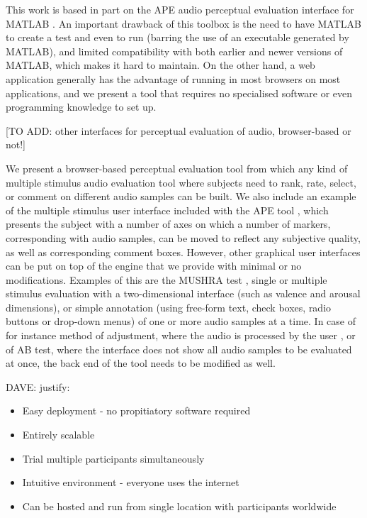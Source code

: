 \documentclass{article}
\begin{document}
This work is based in part on the APE audio perceptual evaluation interface for MATLAB \cite{deman2014b}. An important drawback of this toolbox is the need to have MATLAB to create a test and even to run (barring the use of an executable generated by MATLAB), and limited compatibility with both earlier and newer versions of MATLAB, which makes it hard to maintain. On the other hand, a web application generally has the advantage of running in most browsers on most applications, and we present a tool that requires no specialised software or even programming knowledge to set up. 

[TO ADD: other interfaces for perceptual evaluation of audio, browser-based or not!] %

We present a browser-based perceptual evaluation tool from which any kind of multiple stimulus audio evaluation tool where subjects need to rank, rate, select, or comment on different audio samples can be built. 
We also include an example of the multiple stimulus user interface included with the APE tool \cite{deman2014b}, which presents the subject with a number of axes on which a number of markers, corresponding with audio samples, can be moved to reflect any subjective quality, as well as corresponding comment boxes. 
However, other graphical user interfaces can be put on top of the engine that we provide with minimal or no modifications. Examples of this are the MUSHRA test \cite{mushra}, single or multiple stimulus evaluation with a two-dimensional interface (such as valence and arousal dimensions), or simple annotation (using free-form text, check boxes, radio buttons or drop-down menus) of one or more audio samples at a time. 
In case of for instance method of adjustment, where the audio is processed by the user \cite{bech}, or of AB test, where the interface does not show all audio samples to be evaluated at once, the back end of the tool needs to be modified as well. 


DAVE: justify:
\begin{itemize}
\item Easy deployment - no propitiatory software required
\item Entirely scalable
\item Trial multiple participants simultaneously
\item Intuitive environment - everyone uses the internet
\item Can be hosted and run from single location with participants worldwide
\end{itemize}
\end{document}
